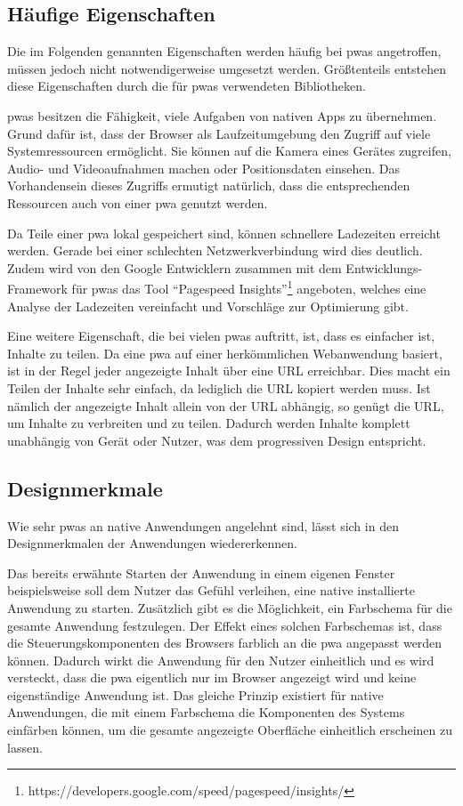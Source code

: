 \documentclass[12pt, parskip=half]{scrartcl}       %
\begin{document}
\subsection{Häufige Eigenschaften}

Die im Folgenden genannten Eigenschaften werden häufig bei \acp{pwa} angetroffen, müssen jedoch nicht notwendigerweise umgesetzt werden.
Größtenteils entstehen diese Eigenschaften durch die für \acp{pwa} verwendeten Bibliotheken.

\acp{pwa} besitzen die Fähigkeit, viele Aufgaben von nativen Apps zu übernehmen.
Grund dafür ist, dass der Browser als Laufzeitumgebung den Zugriff auf viele Systemressourcen ermöglicht.
Sie können auf die Kamera eines Gerätes zugreifen, Audio- und Videoaufnahmen machen oder Positionsdaten einsehen.
Das Vorhandensein dieses Zugriffs ermutigt natürlich, dass die entsprechenden Ressourcen auch von einer \ac{pwa} genutzt werden.

Da Teile einer \ac{pwa} lokal gespeichert sind, können schnellere Ladezeiten erreicht werden.
Gerade bei einer schlechten Netzwerkverbindung wird dies deutlich.
Zudem wird von den Google Entwicklern zusammen mit dem Entwicklungs-Framework für \acp{pwa} das Tool \enquote{Pagespeed Insights}\footnote{https://developers.google.com/speed/pagespeed/insights/} angeboten, welches eine Analyse der Ladezeiten vereinfacht und Vorschläge zur Optimierung gibt.

Eine weitere Eigenschaft, die bei vielen \acp{pwa} auftritt, ist, dass es einfacher ist, Inhalte zu teilen.
Da eine \ac{pwa} auf einer herkömmlichen Webanwendung basiert, ist in der Regel jeder angezeigte Inhalt über eine URL erreichbar.
Dies macht ein Teilen der Inhalte sehr einfach, da lediglich die URL kopiert werden muss.
Ist nämlich der angezeigte Inhalt allein von der URL abhängig, so genügt die URL, um Inhalte zu verbreiten und zu teilen.
Dadurch werden Inhalte komplett unabhängig von Gerät oder Nutzer, was dem progressiven Design entspricht.


\subsection{Designmerkmale}

Wie sehr \acp{pwa} an native Anwendungen angelehnt sind, lässt sich in den Designmerkmalen der Anwendungen wiedererkennen.

Das bereits erwähnte Starten der Anwendung in einem eigenen Fenster beispielsweise soll dem Nutzer das Gefühl verleihen, eine native installierte Anwendung zu starten.
Zusätzlich gibt es die Möglichkeit, ein Farbschema für die gesamte Anwendung festzulegen.
Der Effekt eines solchen Farbschemas ist, dass die Steuerungskomponenten des Browsers farblich an die \ac{pwa} angepasst werden können.
Dadurch wirkt die Anwendung für den Nutzer einheitlich und es wird versteckt, dass die \ac{pwa} eigentlich nur im Browser angezeigt wird und keine eigenständige Anwendung ist.
Das gleiche Prinzip existiert für native Anwendungen, die mit einem Farbschema die Komponenten des Systems einfärben können, um die gesamte angezeigte Oberfläche einheitlich erscheinen zu lassen.
\end{document}
